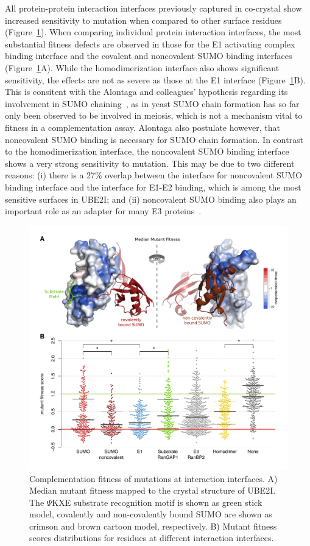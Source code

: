 All protein-protein interaction interfaces previously captured in co-crystal show increased sensitivity to mutation when compared to other surface residues (Figure~\ref{fig:ube2i_interfaces}). When comparing individual protein interaction interfaces, the most substantial fitness defects are observed in those for the E1 activating complex binding interface and the covalent and noncovalent SUMO binding interfaces (Figure~\ref{fig:ube2i_interfaces}A). While the homodimerization interface also shows significant sensitivity, the effects are not as severe as those at the E1 interface (Figure~\ref{fig:ube2i_interfaces}B). This is consitent with the Alontaga and colleagues' hypothesis regarding its involvement in SUMO chaining~\cite{alontaga}, as in yeast SUMO chain formation has so far only been observed to be involved in meiosis, which is not a mechanism vital to fitness in a complementation assay. Alontaga \etal also postulate however, that noncovalent SUMO binding is necessary for SUMO chain formation. In contrast to the homodimerization interface, the noncovalent SUMO binding interface shows a very strong sensitivity to mutation. This may be due to two different reasons: (i) there is a 27\% overlap between the interface for noncovalent SUMO binding interface and the interface for E1-E2 binding, which is among the most sensitive surfaces in UBE2I; and (ii) noncovalent SUMO binding also plays an important role as an adapter for many E3 proteins~\cite{pias}.

\begin{figure}[h!]
	\centering
	\includegraphics[width=\textwidth]{img/ube2i_interfaces.pdf}
	\caption{Complementation fitness of mutations at interaction interfaces. A) Median mutant fitness mapped to the crystal structure of UBE2I. The $\Psi$KXE substrate recognition motif is shown as green stick model, covalently and non-covalently bound SUMO are shown as crimson and brown cartoon model, respectively. B) Mutant fitness scores distributions for residues at different interaction interfaces. }
	\label{fig:ube2i_interfaces}
\end{figure}



